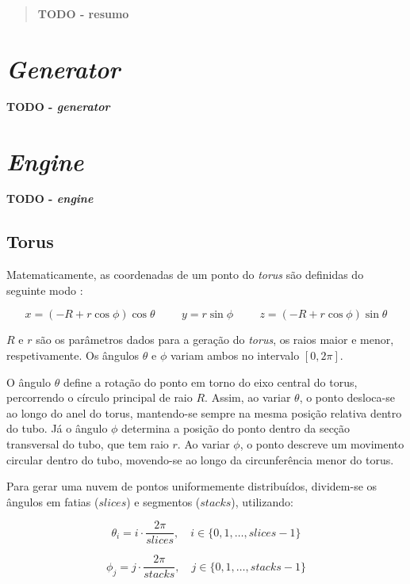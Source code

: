 \documentclass[12pt, a4paper]{article}
\begin{document}
\pagebreak

\begin{abstract}
    \textbf{\color{red} TODO - resumo}
\end{abstract}

\section{\emph{Generator}}

\textbf{\color{red} TODO - \emph{generator}}

\section{\emph{Engine}}

\textbf{\color{red} TODO - \emph{engine}}

\subsection{Torus}

Matematicamente, as coordenadas de um ponto do \emph{torus} são definidas do seguinte modo
\cite{torus}:

$$
x = (-R + r \cos \phi) \cos \theta
\hspace{1cm}
y = r \sin \phi
\hspace{1cm}
z = (-R + r \cos \phi) \sin \theta
$$

$R$ e $r$ são os parâmetros dados para a geração do \emph{torus}, os raios maior e menor,
respetivamente. Os ângulos $\theta$ e $\phi$ variam ambos no intervalo $[0, 2\pi]$.

O ângulo $\theta$ define a rotação do ponto em torno do eixo central do torus, percorrendo o
círculo principal de raio $R$. Assim, ao variar $\theta$, o ponto desloca-se ao longo do anel do
torus, mantendo-se sempre na mesma posição relativa dentro do tubo. Já o ângulo $\phi$ determina a
posição do ponto dentro da secção transversal do tubo, que tem raio $r$. Ao variar $\phi$, o ponto
descreve um movimento circular dentro do tubo, movendo-se ao longo da circunferência menor do torus.

Para gerar uma nuvem de pontos uniformemente distribuídos, dividem-se os ângulos em fatias
($slices$) e segmentos ($stacks$), utilizando:

$$
\theta_i = i \cdot \frac{2\pi}{slices}, \quad i \in \{0, 1, \ldots, slices-1\}
$$

$$
\phi_j = j \cdot \frac{2\pi}{stacks}, \quad j \in \{0, 1, \ldots, stacks-1\}
$$
\end{document}
